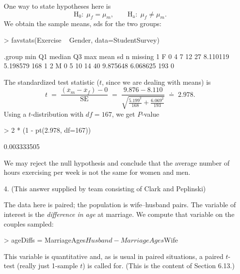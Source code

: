 \documentclass{article}
\begin{document}
\begin{enumerate}
One way to state hypotheses here is
$$ \mathrm{H_0}\colon\; \mu_f = \mu_m, \qquad
  \mathrm{H_a}\colon\; \mu_f \ne \mu_m. $$
We obtain the sample means, sds for the two groups:
\begin{Schunk}
\begin{Sinput}
> favstats(Exercise ~ Gender, data=StudentSurvey)
\end{Sinput}
\begin{Soutput}
  .group min Q1 median Q3 max     mean       sd   n missing
1      F   0  4      7 12  27 8.110119 5.198579 168       1
2      M   0  5     10 14  40 9.875648 6.068625 193       0
\end{Soutput}
\end{Schunk}
The standardized test statistic ($t$, since we are
dealing with means) is
$$ t \;=\; \frac{(\overline x_m - \overline x_f) - 0}
  {\mbox{SE}} \;=\; \frac{9.876 - 8.110}
  {\sqrt{\frac{5.199^2}{168} + \frac{6.069^2}{193}}}
  \;\doteq\; 2.978. $$
Using a $t$-distribution with $df = 167$, we get
$P$-value
\begin{Schunk}
\begin{Sinput}
> 2 * (1 - pt(2.978, df=167))
\end{Sinput}
\begin{Soutput}
[1] 0.003333505
\end{Soutput}
\end{Schunk}
We may reject the null hypothesis and conclude that
the average number of hours exercising per week is not the same for women and men.


\item[4.]
(This answer supplied by team consisting of Clark and Peplinski)

The data here is paired; the population is wife--husband
pairs.  The variable of interest is the \textit{difference in age}
at marriage.  We compute that variable on the couples sampled:
\begin{Schunk}
\begin{Sinput}
> ageDiffs = MarriageAges$Husband-MarriageAges$Wife
\end{Sinput}
\end{Schunk}
This variable is quantitative and, as is usual in paired
situations, a paired $t$-test (really just 1-sample $t$)
is called for.  (This is the content of Section 6.13.)


\end{enumerate}
\end{document}
